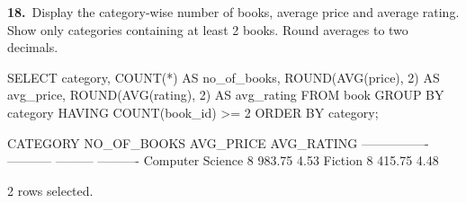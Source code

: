 \noindent\begin{minipage}{\linewidth}
\begingroup{}
{\fontsize{14}{17}\selectfont\textbf{18.}}\ Display the category-wise number of books, average price and average rating. Show only categories containing at least 2 books. Round averages to two decimals.\par
\endgroup\vspace{12pt}


\begin{sqlcode}
SELECT category, COUNT(*) AS no_of_books,
       ROUND(AVG(price), 2) AS avg_price,
       ROUND(AVG(rating), 2) AS avg_rating
FROM book
GROUP BY category
HAVING COUNT(book_id) >= 2
ORDER BY category;
\end{sqlcode}

\vspace{18pt}


\begin{sqlout}[fontsize=\small]
CATEGORY          NO_OF_BOOKS  AVG_PRICE  AVG_RATING
----------------  -----------  ---------  ----------
Computer Science            8     983.75        4.53
Fiction                     8     415.75        4.48

2 rows selected.
\end{sqlout}
\end{minipage}\par\vspace{24pt}

